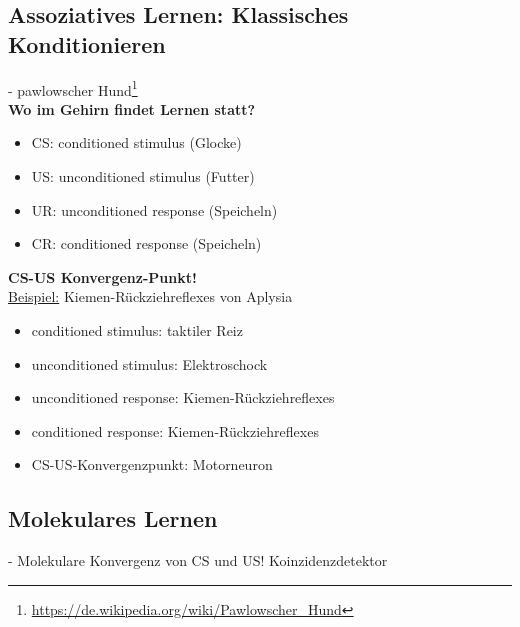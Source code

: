 \subsection{Assoziatives Lernen: Klassisches Konditionieren}
 - pawlowscher Hund\footnote{\url{https://de.wikipedia.org/wiki/Pawlowscher_Hund}}\\

\textbf{Wo im Gehirn findet Lernen statt?}
\begin{itemize}
	\item CS: conditioned stimulus (Glocke)
	\item US: unconditioned stimulus (Futter)
	\item UR: unconditioned response (Speicheln)
	\item CR: conditioned response (Speicheln)
\end{itemize}

\textbf{CS-US Konvergenz-Punkt!}\\

\underline{Beispiel:} Kiemen-Rückziehreflexes von Aplysia
\begin{itemize}
	\item conditioned stimulus: taktiler Reiz
	\item unconditioned stimulus: Elektroschock
	\item unconditioned response: Kiemen-Rückziehreflexes
	\item conditioned response: Kiemen-Rückziehreflexes
	\item CS-US-Konvergenzpunkt: Motorneuron
\end{itemize}

\subsection{Molekulares Lernen}
 - Molekulare Konvergenz von CS und US! Koinzidenzdetektor